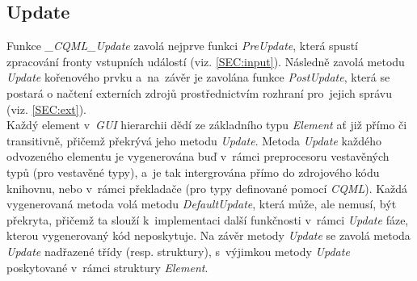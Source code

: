 \documentclass[11pt,twoside,a4paper]{book}
\begin{document}
\subsection{Update}
Funkce\textit{ \_CQML\_Update} zavolá nejprve funkci \textit{PreUpdate}, která spustí zpracování fronty vstupních událostí (viz. \ref{SEC:input}). Následně zavolá metodu \textit{Update} kořenového prvku a~na~závěr je zavolána funkce \textit{PostUpdate}, která se postará o načtení externích zdrojů prostřednictvím rozhraní pro~jejich správu (viz. \ref{SEC:ext}).\\
Každý element v~\textit{GUI} hierarchii dědí ze základního typu \textit{Element} ať již přímo či transitivně, přičemž překrývá jeho metodu \textit{Update}. Metoda \textit{Update} každého odvozeného elementu je vygenerována buď v~rámci preprocesoru vestavěných typů (pro vestavěné typy), a~je tak intergrována přímo do zdrojového kódu knihovnu, nebo v~rámci překladače (pro typy definované pomocí \textit{CQML}). Každá vygenerovaná metoda volá metodu \textit{DefaultUpdate}, která může, ale nemusí, být překryta, přičemž ta slouží k~implementaci další funkčnosti v~rámci \textit{Update} fáze, kterou vygenerovaný kód neposkytuje. Na závěr metody \textit{Update} se zavolá metoda \textit{Update} nadřazené třídy (resp. struktury), s~výjimkou metody \textit{Update} poskytované v~rámci struktury \textit{Element}.
\end{document}
